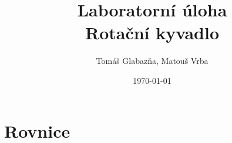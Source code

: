 \documentclass[11pt,a4paper]{article}
\title{%
  Laboratorní úloha \\
  \large Rotační kyvadlo}
\author{Tomáš Glabazňa, Matouš Vrba}
\date{\today}
\begin{document}
\maketitle


\section*{Rovnice}
\end{document}
